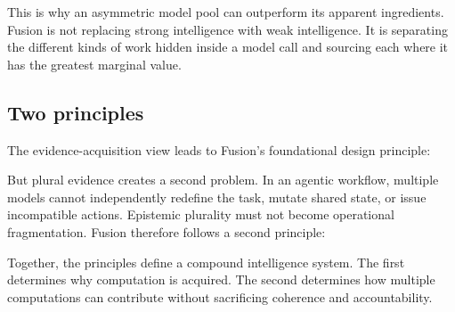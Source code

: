 This is why an asymmetric model pool can outperform its apparent ingredients.
Fusion is not replacing strong intelligence with weak intelligence. It is
separating the different kinds of work hidden inside a model call and sourcing
each where it has the greatest marginal value.

\subsection{Two principles}

The evidence-acquisition view leads to Fusion's foundational design principle:


But plural evidence creates a second problem. In an agentic workflow, multiple
models cannot independently redefine the task, mutate shared state, or issue
incompatible actions. Epistemic plurality must not become operational
fragmentation. Fusion therefore follows a second principle:


Together, the principles define a compound intelligence system. The first
determines why computation is acquired. The second determines how multiple
computations can contribute without sacrificing coherence and accountability.
